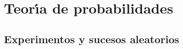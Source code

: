 \documentclass{article}%
\begin{document}
%
%
%

\section{Teor\'{\i}a de probabilidades}

\subsection{Experimentos y sucesos aleatorios}%
\end{document}
